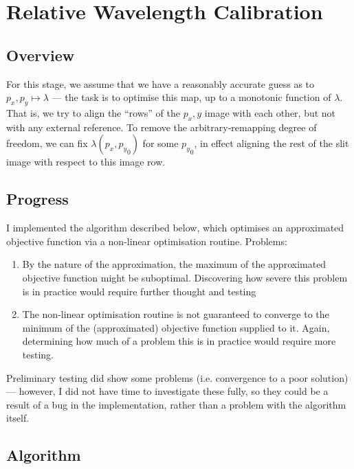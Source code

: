 \section{Relative Wavelength Calibration}
\label{sec:relativeWavelengthCalibration}

\subsection{Overview}

For this stage, we assume that we have a reasonably accurate guess as to
$p_x, p_y \mapsto \lambda$ --- the task is to optimise this map, up to a
monotonic function of $\lambda$. That is, we try to align the ``rows''
of the $p_x, y$ image with each other, but not with any external
reference. To remove the arbitrary-remapping degree of freedom, we can
fix $\lambda(p_x, {p_y}_0)$ for some ${p_y}_0$, in effect aligning the
rest of the slit image with respect to this image row.

\subsection{Progress}

I implemented the algorithm described below, which optimises an
approximated objective function via a non-linear optimisation routine.
Problems:
\begin{enumerate}
\item By the nature of the approximation, the maximum of the
approximated objective function might be suboptimal. Discovering how
severe this problem is in practice would require further thought and
testing
\item The non-linear optimisation routine is not guaranteed to converge
to the minimum of the (approximated) objective function supplied to
it. Again, determining how much of a problem this is in practice would
require more testing.
\end{enumerate}
Preliminary testing did show some problems (i.e. convergence to a poor
solution) --- however, I did not have time to investigate these fully,
so they could be a result of a bug in the implementation, rather than
a problem with the algorithm itself.


\subsection{Algorithm}

